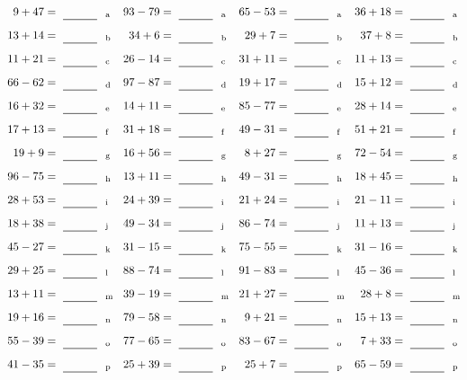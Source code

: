 \documentclass
[
  draft    = true,
  fontsize = 11pt,
  parskip  = half-
]
{scrartcl}
\begin{document}
\clearpage
\begin{align*}
    \pline{9+47}&=\rline{a}
  & \pline{93-79}&=\rline{a}
  & \pline{65-53}&=\rline{a}
  & \pline{36+18}&=\rline{a} \\[1ex]
    \pline{13+14}&=\rline{b}
  & \pline{34+6}&=\rline{b}
  & \pline{29+7}&=\rline{b}
  & \pline{37+8}&=\rline{b} \\[1ex]
    \pline{11+21}&=\rline{c}
  & \pline{26-14}&=\rline{c}
  & \pline{31+11}&=\rline{c}
  & \pline{11+13}&=\rline{c} \\[1ex]
    \pline{66-62}&=\rline{d}
  & \pline{97-87}&=\rline{d}
  & \pline{19+17}&=\rline{d}
  & \pline{15+12}&=\rline{d} \\[1ex]
    \pline{16+32}&=\rline{e}
  & \pline{14+11}&=\rline{e}
  & \pline{85-77}&=\rline{e}
  & \pline{28+14}&=\rline{e} \\[1ex]
    \pline{17+13}&=\rline{f}
  & \pline{31+18}&=\rline{f}
  & \pline{49-31}&=\rline{f}
  & \pline{51+21}&=\rline{f} \\[1ex]
    \pline{19+9}&=\rline{g}
  & \pline{16+56}&=\rline{g}
  & \pline{8+27}&=\rline{g}
  & \pline{72-54}&=\rline{g} \\[1ex]
    \pline{96-75}&=\rline{h}
  & \pline{13+11}&=\rline{h}
  & \pline{49-31}&=\rline{h}
  & \pline{18+45}&=\rline{h} \\[1ex]
    \pline{28+53}&=\rline{i}
  & \pline{24+39}&=\rline{i}
  & \pline{21+24}&=\rline{i}
  & \pline{21-11}&=\rline{i} \\[1ex]
    \pline{18+38}&=\rline{j}
  & \pline{49-34}&=\rline{j}
  & \pline{86-74}&=\rline{j}
  & \pline{11+13}&=\rline{j} \\[1ex]
    \pline{45-27}&=\rline{k}
  & \pline{31-15}&=\rline{k}
  & \pline{75-55}&=\rline{k}
  & \pline{31-16}&=\rline{k} \\[1ex]
    \pline{29+25}&=\rline{l}
  & \pline{88-74}&=\rline{l}
  & \pline{91-83}&=\rline{l}
  & \pline{45-36}&=\rline{l} \\[1ex]
    \pline{13+11}&=\rline{m}
  & \pline{39-19}&=\rline{m}
  & \pline{21+27}&=\rline{m}
  & \pline{28+8}&=\rline{m} \\[1ex]
    \pline{19+16}&=\rline{n}
  & \pline{79-58}&=\rline{n}
  & \pline{9+21}&=\rline{n}
  & \pline{15+13}&=\rline{n} \\[1ex]
    \pline{55-39}&=\rline{o}
  & \pline{77-65}&=\rline{o}
  & \pline{83-67}&=\rline{o}
  & \pline{7+33}&=\rline{o} \\[1ex]
    \pline{41-35}&=\rline{p}
  & \pline{25+39}&=\rline{p}
  & \pline{25+7}&=\rline{p}
  & \pline{65-59}&=\rline{p}
\end{align*}
\end{document}
